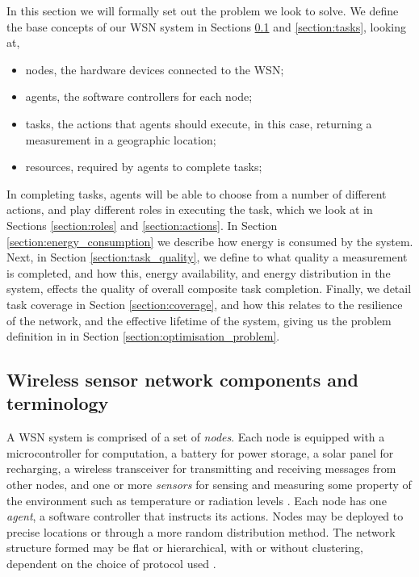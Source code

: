 
In this section we will formally set out the problem we look to solve. We define the base concepts of our WSN system in Sections \ref{section:terminology} and \ref{section:tasks}, looking at,
\begin{itemize}
	\item nodes, the hardware devices connected to the WSN;
	\item agents, the software controllers for each node;
	\item tasks, the actions that agents should execute, in this case, returning a measurement in a geographic location;
	\item resources, required by agents to complete tasks; 
\end{itemize}
In completing tasks, agents will be able to choose from a number of different actions, and play different roles in executing the task, which we look at in Sections \ref{section:roles} and \ref{section:actions}. In Section \ref{section:energy_consumption} we describe how energy is consumed by the system. Next, in Section \ref{section:task_quality}, we define to what quality a measurement is completed, and how this, energy availability, and energy distribution in the system, effects the quality of overall composite task completion. Finally, we detail task coverage in Section \ref{section:coverage}, and how this relates to the resilience of the network, and the effective lifetime of the system, giving us the problem definition in in Section \ref{section:optimisation_problem}.

\subsection{Wireless sensor network components and terminology}
\label{section:terminology}

A WSN system is comprised of a set of \textit{nodes}. Each node is equipped with a microcontroller for computation, a battery for power storage, a solar panel for recharging, a wireless transceiver for  transmitting and receiving messages from other nodes, and one or more \textit{sensors} for sensing and measuring some property of the environment such as temperature or radiation levels \citep{muhammad_r_ahmed_2012_1072589}. Each node has one \textit{agent}, a software controller that instructs its actions. Nodes may be deployed to precise locations or through a more random distribution method. The network structure formed may be flat or hierarchical, with or without clustering, dependent on the choice of protocol used \citep{Carlos-Mancilla2016b}. 

